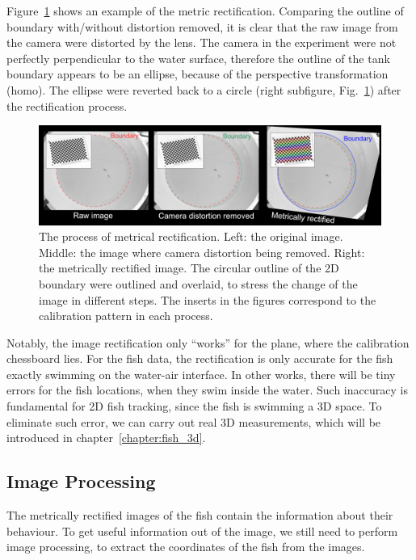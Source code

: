 \documentclass[11pt,twoside]{report}
\begin{document}
Figure~\ref{fig:metric-rectify} shows an example of the metric rectification. Comparing the outline of boundary with/without distortion removed, it is clear that the raw image from the camera were distorted by the lens. The camera in the experiment were not perfectly perpendicular to the water surface, therefore the outline of the tank boundary appears to be an ellipse, because of the perspective transformation (\gls{homo}). The ellipse were reverted back to a circle (right subfigure, Fig.~\ref{fig:metric-rectify}) after the rectification process.

\begin{figure}
  \includegraphics[width=\linewidth]{image-calib-2d.png}
  \caption[Metrical rectification of an image.]{
  	The process of metrical rectification. Left: the original image. Middle: the image where camera distortion being removed. Right: the metrically rectified image. The circular outline of the 2D boundary were outlined and overlaid, to stress the change of the image in different steps. The inserts in the figures correspond to the calibration pattern in each process.
  }
  \label{fig:metric-rectify}
\end{figure}


Notably, the image rectification only ``works'' for the plane, where the calibration chessboard lies. For the fish data, the rectification is only accurate for the fish exactly swimming on the water-air interface. In other works, there will be tiny errors for the fish locations, when they swim inside the water. Such inaccuracy is fundamental for 2D fish tracking, since the fish is swimming a 3D space. To eliminate such error, we can carry out real 3D measurements, which will be introduced in chapter~\ref{chapter:fish_3d}.


\subsection{Image Processing}
\label{section:image_process}


The metrically rectified images of the fish contain the information about their behaviour.
To get useful information out of the image, we still need to perform image processing, to extract the coordinates of the fish from the images.
\end{document}
